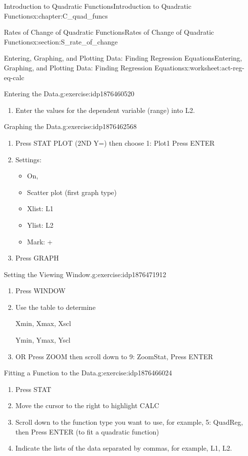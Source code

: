 \documentclass[oneside,10pt,]{book}
\numberwithin{equation}{chapter}
\begin{document}
\begin{chapterptx}{Introduction to Quadratic Functions}{}{Introduction to Quadratic Functions}{}{}{x:chapter:C_quad_funcs}
\begin{sectionptx}{Rates of Change of Quadratic Functions}{}{Rates of Change of Quadratic Functions}{}{}{x:section:S_rate_of_change}
\begin{worksheet-subsection}{Entering, Graphing, and Plotting Data: Finding Regression Equations}{}{Entering, Graphing, and Plotting Data: Finding Regression Equations}{}{}{x:worksheet:act-reg-eq-calc}
\begin{divisionexercise}{1}{Entering the Data.}{}{g:exercise:idp1876460520}
\begin{enumerate}[font=\bfseries,label=(\alph*),ref=\alph*]
\item{}Enter the values for the dependent variable (range) into L2.%
\end{enumerate}
\end{divisionexercise}%
\begin{divisionexercise}{2}{Graphing the Data.}{}{g:exercise:idp1876462568}%
\begin{enumerate}[font=\bfseries,label=(\alph*),ref=\alph*]
\item{}Press STAT PLOT (2ND Y=) then choose 1: Plot1\textellipsis{} Press ENTER%
\item{}Settings:%
\begin{itemize}[label=\textbullet]
\item{}On,%
\item{}Scatter plot (first graph type)%
\item{}Xlist: L1%
\item{}Ylist: L2%
\item{}Mark: +%
\end{itemize}
%
\item{}Press GRAPH%
\end{enumerate}
\end{divisionexercise}%
\begin{divisionexercise}{3}{Setting the Viewing Window.}{}{g:exercise:idp1876471912}%
\begin{enumerate}[font=\bfseries,label=(\alph*),ref=\alph*]
\item{}Press WINDOW%
\item{}Use the table to determine%
\par
Xmin, Xmax, Xscl%
\par
Ymin, Ymax, Yscl%
\item{}OR Press ZOOM then scroll down to 9: ZoomStat, Press ENTER%
\end{enumerate}
\end{divisionexercise}%
\begin{divisionexercise}{4}{Fitting a Function to the Data.}{}{g:exercise:idp1876466024}%
\begin{enumerate}[font=\bfseries,label=(\alph*),ref=\alph*]
\item{}Press STAT%
\item{}Move the cursor to the right to highlight CALC%
\item{}Scroll down to the function type you want to use, for example, 5: QuadReg, then Press ENTER (to fit a quadratic function)%
\item{}Indicate the lists of the data separated by commas, for example, L1, L2.%

\end{enumerate}
\end{divisionexercise}
\end{worksheet-subsection}
\end{sectionptx}
\end{chapterptx}
\end{document}
